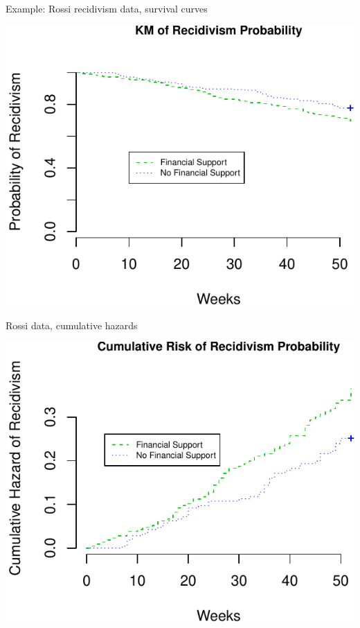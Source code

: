 \documentclass[ignorenonframetext,]{beamer}
\begin{document}
\begin{frame}{%
\protect\hypertarget{example-rossi-recidivism-data-survival-curves}{%
Example: Rossi recidivism data, survival curves}}

\includegraphics{unit_04_ph_reg_basics_files/figure-beamer/unnamed-chunk-1-1.pdf}

\end{frame}

\begin{frame}{%
\protect\hypertarget{rossi-data-cumulative-hazards}{%
Rossi data, cumulative hazards}}

\includegraphics{unit_04_ph_reg_basics_files/figure-beamer/unnamed-chunk-2-1.pdf}

\end{frame}
\end{document}
